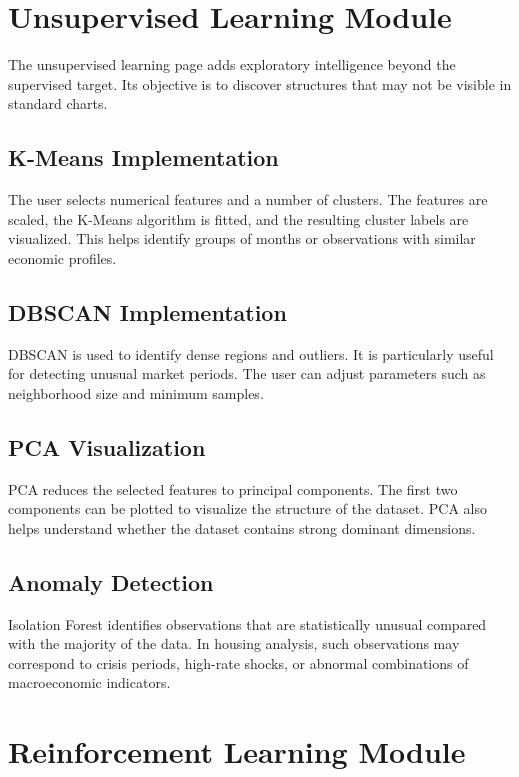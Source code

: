 \section{Unsupervised Learning Module}

The unsupervised learning page adds exploratory intelligence beyond the supervised target. Its objective is to discover structures that may not be visible in standard charts.

\subsection{K-Means Implementation}

The user selects numerical features and a number of clusters. The features are scaled, the K-Means algorithm is fitted, and the resulting cluster labels are visualized. This helps identify groups of months or observations with similar economic profiles.

\subsection{DBSCAN Implementation}

DBSCAN is used to identify dense regions and outliers. It is particularly useful for detecting unusual market periods. The user can adjust parameters such as neighborhood size and minimum samples.

\subsection{PCA Visualization}

PCA reduces the selected features to principal components. The first two components can be plotted to visualize the structure of the dataset. PCA also helps understand whether the dataset contains strong dominant dimensions.

\subsection{Anomaly Detection}

Isolation Forest identifies observations that are statistically unusual compared with the majority of the data. In housing analysis, such observations may correspond to crisis periods, high-rate shocks, or abnormal combinations of macroeconomic indicators.

\section{Reinforcement Learning Module}

